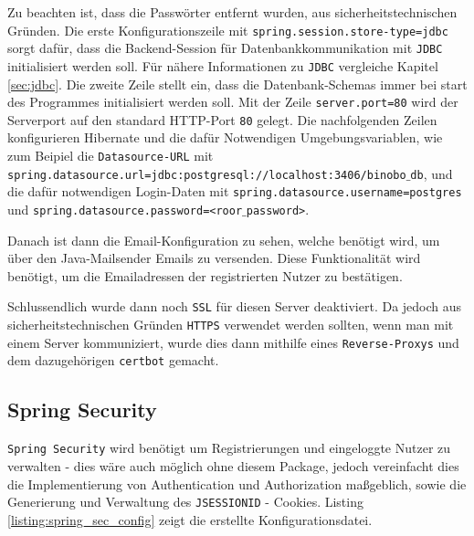 \documentclass[paper=a4,12pt]{scrreprt}
\begin{document}
Zu beachten ist, dass die Passwörter entfernt wurden, aus sicherheitstechnischen Gründen.\newline
Die erste Konfigurationszeile mit \texttt{spring.session.store-type=jdbc} sorgt dafür, dass die Backend-Session für Datenbankkommunikation mit \texttt{JDBC}\cite{spring_jdbc} initialisiert werden soll. Für nähere Informationen zu
\texttt{JDBC}\cite{spring_jdbc} vergleiche Kapitel \ref{sec:jdbc}.\newline
Die zweite Zeile stellt ein, dass die Datenbank-Schemas immer bei start des Programmes initialisiert werden soll. Mit der Zeile \texttt{server.port=80} wird der Serverport auf den standard HTTP-Port \texttt{80} gelegt.\newline
Die nachfolgenden Zeilen konfigurieren Hibernate und die dafür Notwendigen Umgebungsvariablen, wie zum Beipiel die \texttt{Datasource-URL} mit \newline\texttt{spring.datasource.url=jdbc:postgresql://localhost:3406/binobo$\_$db},
und die dafür notwendigen Login-Daten mit \texttt{spring.datasource.username=postgres} und \texttt{spring.datasource.password=<roor$\_$password>}.\newline

Danach ist dann die Email-Konfiguration zu sehen, welche benötigt wird, um über den Java-Mailsender Emails zu versenden. Diese Funktionalität wird benötigt, um die Emailadressen der registrierten Nutzer zu bestätigen.\newline

Schlussendlich wurde dann noch \texttt{SSL}\cite{ssl} für diesen Server deaktiviert. Da jedoch aus sicherheitstechnischen Gründen \texttt{HTTPS} verwendet werden sollten, wenn man mit einem Server kommuniziert,
wurde dies dann mithilfe eines \texttt{Reverse-Proxys} und dem dazugehörigen \texttt{certbot}\cite{certbot} gemacht.\newline

\subsection{Spring Security}

\texttt{Spring Security}\cite{spring_sec} wird benötigt um Registrierungen und eingeloggte Nutzer zu verwalten - dies wäre auch möglich ohne diesem Package, jedoch vereinfacht dies die Implementierung von Authentication und Authorization
maßgeblich, sowie die Generierung und Verwaltung des \texttt{JSESSIONID} - Cookies.\newline
Listing \ref{listing:spring_sec_config} zeigt die erstellte Konfigurationsdatei.\newline
\end{document}
